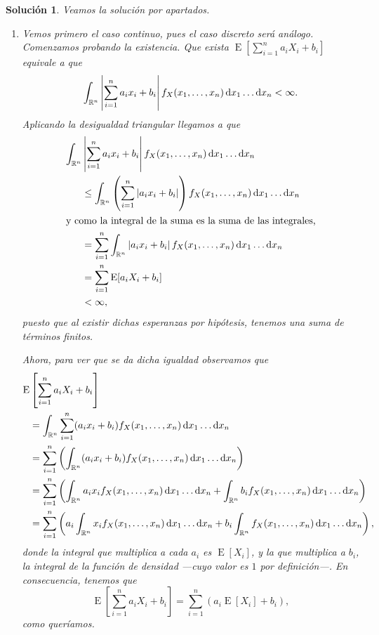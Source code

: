 \documentclass[
  a4paper,
  spanish,
  12pt,
]{scrartcl}
\theoremstyle{ejercicio-style}
\theoremstyle{remark-style}
\newtheorem*{sol}{Solución}
\begin{document}
\begin{sol}
  Veamos la solución por apartados. \begin{enumerate}
    \item Vemos primero el caso continuo, pues el caso discreto será análogo. 
    Comenzamos probando la existencia. 
    Que exista \(\operatorname{E}\left[\sum_{i=1}^n a_iX_i + b_i\right]\) equivale a que \[
      \int_{\mathbb R^n}\left|\sum_{i=1}^n a_ix_i + b_i\right| f_X(x_1, \dots, x_n)\dif x_1\dots\dif x_n < \infty.
    \] 
    Aplicando la desigualdad triangular llegamos a que \begin{align*}
      \int_{\mathbb R^n}&\left|\sum_{i=1}^n a_ix_i + b_i\right| f_X(x_1, \dots, x_n)\dif x_1\dots\dif x_n\\
        &\leq \int_{\mathbb R^n}\left(\sum_{i=1}^n \left|a_ix_i + b_i\right|\right) f_X(x_1, \dots, x_n)\dif x_1\dots\dif x_n\\
        \intertext{y como la integral de la suma es la suma de las integrales,}
        &= \sum_{i=1}^n\int_{\mathbb R^n}\left|a_ix_i + b_i\right| f_X(x_1, \dots, x_n)\dif x_1\dots\dif x_n\\
        &= \sum_{i=1}^n \operatorname{E}[a_iX_i + b_i]\\
        &< \infty,
    \end{align*} puesto que al existir dichas esperanzas por hipótesis, tenemos una suma de términos finitos.

    Ahora, para ver que se da dicha igualdad observamos que \begin{align*}
      \operatorname{E}&\left[\sum_{i=1}^n a_iX_i + b_i\right] \\
        &= \int_{\mathbb R^n}\sum_{i=1}^n (a_ix_i + b_i) f_X(x_1, \dots, x_n)\dif x_1\dots\dif x_n\\
        &= \sum_{i=1}^n\left(\int_{\mathbb R^n} (a_ix_i + b_i) f_X(x_1, \dots, x_n)\dif x_1\dots\dif x_n\right)\\
        &= \sum_{i=1}^n\left(\int_{\mathbb R^n} a_ix_if_X(x_1, \dots, x_n)\dif x_1\dots\dif x_n + \int_{\mathbb R^n} b_if_X(x_1, \dots, x_n)\dif x_1\dots\dif x_n\right)\\
        &= \sum_{i=1}^n\left(a_i\int_{\mathbb R^n}x_if_X(x_1, \dots, x_n)\dif x_1\dots\dif x_n + b_i\int_{\mathbb R^n} f_X(x_1, \dots, x_n)\dif x_1\dots\dif x_n\right),
    \end{align*} donde la integral que multiplica a cada \(a_i\) es \(\operatorname{E}[X_i]\), y la que multiplica a \(b_i\), la integral de la función de densidad ---cuyo valor es \(1\) por definición---. 
    En consecuencia, tenemos que \[
      \operatorname{E}\left[\sum_{i=1}^n a_iX_i + b_i\right] = \sum_{i=1}^n\left(a_i \operatorname{E}[X_i] + b_i\right),
    \] como queríamos.


\end{enumerate}
\end{sol}
\end{document}
